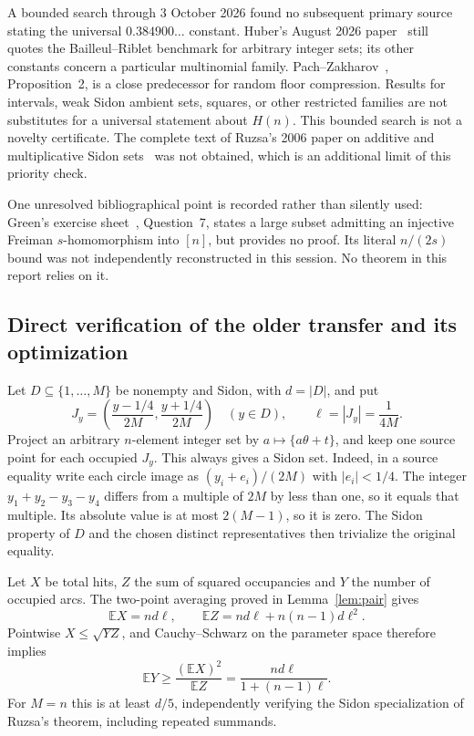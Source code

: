 \documentclass[11pt]{article}
\theoremstyle{definition}
\theoremstyle{remark}
\newcommand{\E}{\mathbb E}
\begin{document}
A bounded search through 3 October 2026 found no subsequent primary source
stating the universal $0.384900\ldots$ constant. Huber's August 2026
paper~\cite{Huber} still quotes the Bailleul--Riblet benchmark for arbitrary
integer sets; its other constants concern a particular multinomial
family. Pach--Zakharov~\cite{PZ}, Proposition~2, is a close predecessor for
random floor compression. Results for intervals, weak Sidon ambient
sets, squares, or other restricted families are not substitutes for a
universal statement about $H(n)$. This bounded search is not a novelty
certificate. The complete text of Ruzsa's 2006 paper on additive and
multiplicative Sidon sets~\cite{Ruzsa2006} was not obtained, which is
an additional limit of this priority check.

One unresolved bibliographical point is recorded rather than silently
used: Green's exercise sheet~\cite{Green}, Question~7, states a large
subset admitting an injective Freiman $s$-homomorphism into $[n]$, but
provides no proof. Its literal $n/(2s)$ bound was not independently
reconstructed in this session. No theorem in this report relies on it.

\subsection{Direct verification of the older transfer and its optimization}

Let $D\subseteq\{1,\ldots,M\}$ be nonempty and Sidon, with $d=|D|$, and put
\[
J_y=\left(\frac{y-1/4}{2M},\frac{y+1/4}{2M}\right)
\quad(y\in D),\qquad \ell=|J_y|=\frac1{4M}.
\]
Project an arbitrary $n$-element integer set by $a\mapsto\{a\theta+t\}$,
and keep one source point for each occupied $J_y$. This always gives a
Sidon set. Indeed, in a source equality write each circle image as
$(y_i+e_i)/(2M)$ with $|e_i|<1/4$. The integer
$y_1+y_2-y_3-y_4$ differs from a multiple of $2M$ by less than one,
so it equals that multiple. Its absolute value is at most $2(M-1)$,
so it is zero. The Sidon property of $D$ and the chosen distinct
representatives then trivialize the original equality.

Let $X$ be total hits, $Z$ the sum of squared occupancies and $Y$ the
number of occupied arcs. The two-point averaging proved in
Lemma~\ref{lem:pair} gives
\[
\E X=nd\ell,\qquad \E Z=nd\ell+n(n-1)d\ell^2.
\]
Pointwise $X\le\sqrt{YZ}$, and Cauchy--Schwarz on the parameter space
therefore implies
\[
\E Y\ge\frac{(\E X)^2}{\E Z}
=\frac{nd\ell}{1+(n-1)\ell}.
\]
For $M=n$ this is at least $d/5$, independently verifying the Sidon
specialization of Ruzsa's theorem, including repeated summands.
\end{document}

